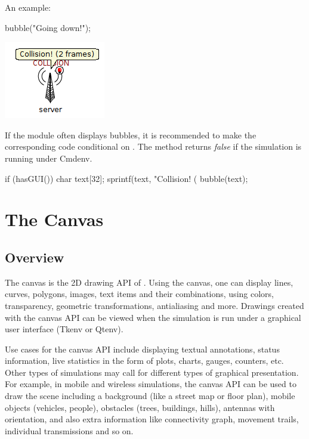 An example:
\begin{cpp}
bubble("Going down!");
\end{cpp}

\begin{center}
\includegraphics{figures/graphics-bubble}
\end{center}

If the module often displays bubbles, it is recommended to make the
corresponding code conditional on . The 
method returns \textit{false} if the simulation is running under Cmdenv.

\begin{cpp}
if (hasGUI()) {
    char text[32];
    sprintf(text, "Collision! (%
    bubble(text);
}
\end{cpp}



\section{The Canvas}
\label{sec:ch-graphics:canvas}

\subsection{Overview}

The canvas is the 2D drawing API of {\opp}. Using the canvas, one can
display lines, curves, polygons, images, text items and their combinations,
using colors, transparency, geometric transformations, antialiasing and
more. Drawings created with the canvas API can be viewed when the simulation
is run under a graphical user interface (Tkenv or Qtenv).

Use cases for the canvas API include displaying textual annotations,
status information, live statistics in the form of plots, charts, gauges,
counters, etc. Other types of simulations may call for different types of
graphical presentation. For example, in mobile and wireless simulations,
the canvas API can be used to draw the scene including a background (like a
street map or floor plan), mobile objects (vehicles, people), obstacles
(trees, buildings, hills), antennas with orientation, and also extra
information like connectivity graph, movement trails, individual
transmissions and so on.

